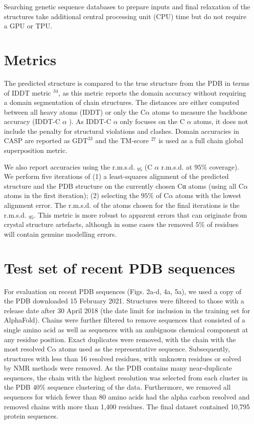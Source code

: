 \documentclass[10pt]{article}
\begin{document}
Searching genetic sequence databases to prepare inputs and final relaxation of the structures take additional central processing unit (CPU) time but do not require a GPU or TPU.

\section*{Metrics}
The predicted structure is compared to the true structure from the PDB in terms of IDDT metric ${ }^{34}$, as this metric reports the domain accuracy without requiring a domain segmentation of chain structures. The distances are either computed between all heavy atoms (IDDT) or only the $\mathrm{C} \alpha$ atoms to measure the backbone accuracy (IDDT-C $\alpha$ ). As IDDT-C $\alpha$ only focuses on the C $\alpha$ atoms, it does not include the penalty for structural violations and clashes. Domain accuracies in CASP are reported as $\mathrm{GDT}^{33}$ and the TM-score ${ }^{27}$ is used as a full chain global superposition metric.

We also report accuracies using the r.m.s.d. ${ }_{95}$ (C $\alpha$ r.m.s.d. at $95 \%$ coverage). We perform five iterations of (1) a least-squares alignment of the predicted structure and the PDB structure on the currently chosen Cα atoms (using all $\mathrm{C} \alpha$ atoms in the first iteration); (2) selecting the $95 \%$ of $\mathrm{C} \alpha$ atoms with the lowest alignment error. The r.m.s.d. of the atoms chosen for the final iterations is the r.m.s.d. ${ }_{95}$. This metric is more robust to apparent errors that can originate from crystal structure artefacts, although in some cases the removed $5 \%$ of residues will contain genuine modelling errors.

\section*{Test set of recent PDB sequences}
For evaluation on recent PDB sequences (Figs. 2a-d, 4a, 5a), we used a copy of the PDB downloaded 15 February 2021. Structures were filtered to those with a release date after 30 April 2018 (the date limit for inclusion in the training set for AlphaFold). Chains were further filtered to remove sequences that consisted of a single amino acid as well as sequences with an ambiguous chemical component at any residue position. Exact duplicates were removed, with the chain with the most resolved $\mathrm{C} \alpha$ atoms used as the representative sequence. Subsequently,\\
structures with less than 16 resolved residues, with unknown residues or solved by NMR methods were removed. As the PDB contains many near-duplicate sequences, the chain with the highest resolution was selected from each cluster in the PDB $40 \%$ sequence clustering of the data. Furthermore, we removed all sequences for which fewer than 80 amino acids had the alpha carbon resolved and removed chains with more than 1,400 residues. The final dataset contained 10,795 protein sequences.
\end{document}
